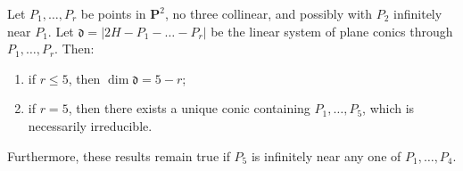 Let $P_1, \ldots, P_r$ be points in $\mathbf{P}^2$, no three collinear, and possibly with $P_2$ infinitely near $P_1$. Let $\mathfrak{d} = |2H - P_1 - \ldots - P_r|$ be the linear system of plane conics through $P_1, \ldots, P_r$. Then:
\begin{enumerate}
\item[(a)] if $r \leqslant 5$, then $\dim \mathfrak{d} = 5 - r$;
\item[(b)] if $r = 5$, then there exists a unique conic containing $P_1, \ldots, P_5$, which is necessarily irreducible.
\end{enumerate}
Furthermore, these results remain true if $P_5$ is infinitely near any one of $P_1, \ldots, P_4$.
